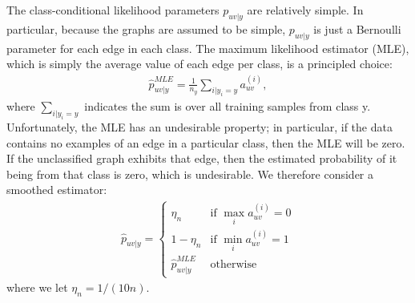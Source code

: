 \documentclass[10pt,journal,cspaper,compsoc]{IEEEtran}
\providecommand{\wh}[1]{\widehat{#1}}
\providecommand{\mt}[1]{\widetilde{#1}}
\begin{document}
The class-conditional likelihood parameters $p_{uv|y}$ are relatively simple.  In particular, because the graphs are assumed to be simple, $p_{uv|y}$ is just a Bernoulli parameter for each edge in each class.  The maximum likelihood estimator (MLE), which is simply the average value of each edge per class, is a principled choice:
\begin{align}
\wh{p}_{uv|y}^{MLE} = \frac{1}{n_y} \sum_{i | y_i = y} a_{uv}^{(i)},
\end{align}
where $\sum_{i | y_i=y}$ indicates the sum is over all training samples from class y. Unfortunately, the MLE has an undesirable property; in particular, if the data contains no examples of an edge in a particular class, then the MLE will be zero.  If the unclassified graph exhibits that edge, then the estimated probability of it being from that class is zero, which is undesirable. We therefore consider a smoothed estimator:
\begin{align} \label{eq:lik}
\wh{p}_{uv|y} = 
\begin{cases}
\eta_n & \text{if } \max_i a_{uv}^{(i)}=0 \\
1- \eta_n & \text{if } \min_i a_{uv}^{(i)}=1 \\
\wh{p}_{uv|y}^{MLE} & \text{otherwise}
\end{cases}
\end{align}
where we let $\eta_n=1/(10n)$.  

\end{document}
